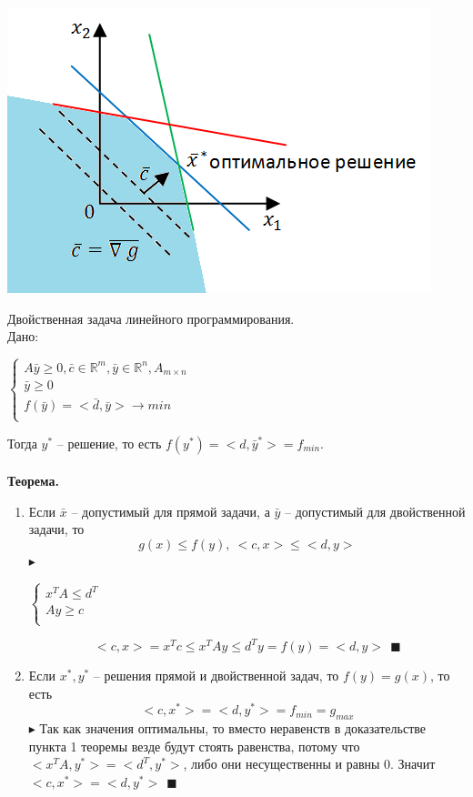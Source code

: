 \documentclass[12pt]{article}
\theoremstyle{definition}
\numberwithin{equation}{section}
\begin{document}
\begin{center}
\includegraphics[scale=0.84]{l18_3.png}\\
\end{center}
Двойственная задача линейного программирования.\\
Дано:
\begin{center}
$
\left\{
\begin{array}{lcl}
   A\bar y\geqslant 0, \bar c\in \mathbb{R}^m, \bar y \in \mathbb{R}^n, A_{m\times n}\\
   \bar y \geqslant 0\\
   f(\bar y)=<\bar d, \bar y> \to min\\
\end{array}
\right.
$
\end{center}
Тогда $y^*$ -- решение, то есть $f(y^*)=<d, \bar y^*>=f_{min}$.\\
\\
\textbf{Теорема.} 
\begin{enumerate}
    \item Если $\bar x$ -- допустимый для прямой задачи, а $\bar y$ -- допустимый для двойственной задачи, то $$g(x)\leqslant f(y), ~<c, x>\leqslant <d, y>$$
    $\blacktriangleright$
\begin{center}    
$
\left\{
\begin{array}{lcl}
   x^TA \leqslant d^T\\
   Ay\geqslant c\\
\end{array}
\right.
$
\end{center}
$$<c, x>=x^Tc\leqslant x^TAy \leqslant d^Ty=f(y)=<d, y>~~\blacksquare$$
    \item Если $x^*, y^*$ -- решения прямой и двойственной задач, то $f(y)=g(x)$, то есть $$<c, x^*>=<d, y^*>=f_{min}=g_{max}$$
    $\blacktriangleright$ Так как значения оптимальны, то вместо неравенств в доказательстве пункта 1 теоремы везде будут стоять равенства, потому что $<x^TA, y^*>=<d^T, y^*>$, либо они несущественны и равны 0. Значит $<c, x^*>=<d, y^*>~~\blacksquare$
\end{enumerate}
\end{document}
